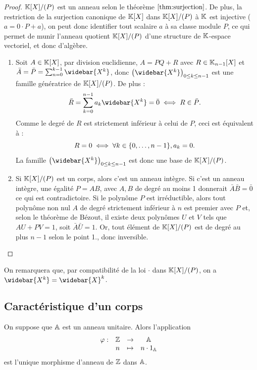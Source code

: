 \begin{proof}
$\mathbb{K}[X]/(P)$ est un anneau selon le théorème $\ref{thm:surjection}$. De plus, la restriction de la surjection canonique de $\mathbb{K}[X]$ 
dans $\mathbb{K}[X]/(P)$ à $\mathbb{K}$ est injective ($a = 0 \cdot P +a$), on peut donc identifier tout scalaire $a$ à sa classe module $P$, 
ce qui permet de munir l'anneau quotient $\mathbb{K}[X]/(P)$ d'une structure de $\mathbb{K}$-espace vectoriel, et donc d'algèbre. \newline

\begin{enumerate}
\item
Soit $A \in \mathbb{K}[X]$, par division euclidienne, $A = PQ + R$ avec $R \in \mathbb{K}_{n-1}[X]$ et 
$\bar{A} = \bar{P} = \sum_{n=0}^{k-1} \widebar{X^k}$, donc $\bigpar{\widebar{X^k}}_{0 \leq k \leq n-1}$ est une famille génératrice 
de $\mathbb{K}[X]/(P)$.
De plus :
\[ \bar{R} = \sum_{k=0}^{n-1} a_ k \widebar{X^k} = \bar{0} \iff R \in \bar{P} . \] 
Comme le degré de $R$ est strictement inférieur à celui de $P$, ceci est équivalent à :
\[ R = 0 \iff \forall k \in \{ 0, \dots, n-1 \}, a_k=0 . \]
La famille $\bigpar{\widebar{X^k}}_{0 \leq k \leq n-1}$ est donc une base de $\mathbb{K}[X]/(P)$. \newline

\item 
Si $\mathbb{K}[X]/(P)$ est un corps, alors c'est un anneau intègre. Si c'est un anneau intègre, une égalité $P=AB$, 
avec $A, B$ de degré au moins 1 donnerait $\bar{A}\bar{B} = \bar{0}$ ce qui est contradictoire.
Si le polynôme $P$ est irréductible, alors tout polynôme non nul $A$ de degré strictement inférieur à $n$ est premier avec $P$ et,
selon le théorème de Bézout, il existe deux polynômes $U$ et $V$ tels que $AU+PV=1$, soit $\bar{A}\bar{U} = 1$.
Or, tout élément de $\mathbb{K}[X]/(P)$ est de degré au plus $n-1$ selon le point 1., donc inversible.
\end{enumerate}
\end{proof}

\begin{rmq}
On remarquera que, par compatibilité de la loi $\cdot$ dans $\mathbb{K}[X]/(P)$, on a $\widebar{X^k} = \widebar{X}^k$.
\end{rmq}

\subsection{Caractéristique d'un corps}

\begin{thm}
\label{thm:morpCarac}
On suppose que $\mathbb{A}$ est un anneau unitaire. Alors l'application
\[ \begin{array}{c c c c}
\varphi : & \mathbb{Z} & \to & \mathbb{A} \\
& n & \mapsto & n \cdot 1_{\mathbb{A}}
\end{array} \]
est l'unique morphisme d'anneau de $\mathbb{Z}$ dans $\mathbb{A}$.
\end{thm}

